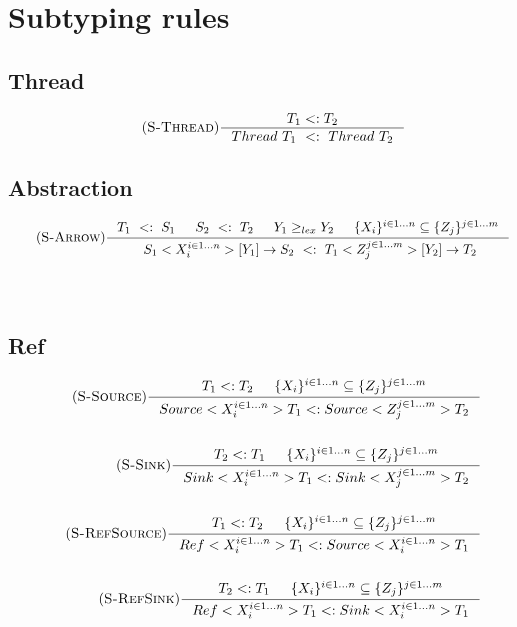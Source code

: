 \documentclass[12pt]{article}
\begin{document}
\section{Subtyping rules}

\subsection{Thread}
\begin{align*}
    \tag {\textsc{S-Thread}}
    \inference[]{T_1 <: T_2}{ Thread~T_1~<:~Thread~T_2}
\end{align*}

\subsection{Abstraction}
\begin{align*}
\tag {\textsc{S-Arrow}}
\inference[]{
    T_1~<:~S_1 & S_2~<:~T_2 & Y_1 \ge_{lex} Y_2 &\{X_i\}^{i\in 1...n} \subseteq   \{Z_j\}^{j\in 1...m}
    }{~S_1<X_i^{i\in 1...n}>[Y_1]\rightarrow S_2~<:~T_1<Z_j^{j\in 1...m}>[Y_2]\rightarrow T_2}
    \\
    \\
\\
\end{align*}

\subsection{Ref}
\begin{align*}
    \tag{\textsc{S-Source}}
    \inference[]{T_1 <: T_2 & \{X_i\}^{i\in 1...n} \subseteq   \{Z_j\}^{j\in 1...m}}{Source<X_i^{i\in 1...n}>T_1 <: Source<Z_j^{j\in 1...m}>T_2}
    \\
    \\
    \tag{\textsc{S-Sink}}
    \inference[]{T_2 <: T_1 & \{X_i\}^{i\in 1...n} \subseteq   \{Z_j\}^{j\in 1...m}}{Sink<X_i^{i\in 1...n}>T_1 <: Sink<X_j^{j\in 1...m}>T_2}
    \\
    \\
    \tag{\textsc{S-RefSource}}
    \inference[]{T_1<:T_2 & \{X_i\}^{i\in 1...n} \subseteq   \{Z_j\}^{j\in 1...m}}{
    Ref<X_i^{i\in 1...n}>T_1 <: Source<X_i^{i\in 1...n}>T_1}
    \\
    \\
    \tag{\textsc{S-RefSink}}
    \inference[]{T_2<:T_1 & \{X_i\}^{i\in 1...n} \subseteq   \{Z_j\}^{j\in 1...m}}
    {Ref<X_i^{i\in 1...n}>T_1 <: Sink<X_i^{i\in 1...n}>T_1}
    \\
    \\
\end{align*}
\end{document}
